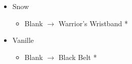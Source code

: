 \begin{paracol}{2}
\begin{menu}
\begin{itemize}
\begin{itemize}
{				      }%
			      {\paradigmline{\com}{(\com)}{(\com)}}%
			      {\paradigmline[2]{\textit{\com}}{\textit{(\com)}}{\textit{(\com)}}}%
			      {\paradigmline{\syn}{\sen}{(\sab)}}%
			      {\paradigmline{[\syn]}{\rav}{(\med)}}%
			      {\paradigmline{\rav}{\rav}{[\med]}}%
			      {\paradigmline{\rav}{\rav}{[\rav]}}
		\end{itemize}
		\equip
		\begin{itemize}
			\item Snow
			      \begin{itemize}
				      \item Blank $\rightarrow$ Warrior's Wristband *
			      \end{itemize}
			\item Vanille
			      \begin{itemize}
				      \item Blank $\rightarrow$ Black Belt *
			      \end{itemize}
		\end{itemize}
	\end{itemize}
\end{menu}
\switchcolumn*

\renewcommand{\first}{[1] Cerberus (\com/\com/\com)}
\renewcommand{\second}{[2] Cerberus (\com/\com/\com)}
\renewcommand{\third}{[3] Premeditation (\syn/\sen/\sab)}
\renewcommand{\fourth}{[4] Coordination (\syn/\rav/\med)}
\renewcommand{\fifth}{[5] Thaumaturgy (\rav/\rav/\med)}
\renewcommand{\sixth}{[6] Tri-Disaster (\rav/\rav/\rav)}


\end{paracol}
